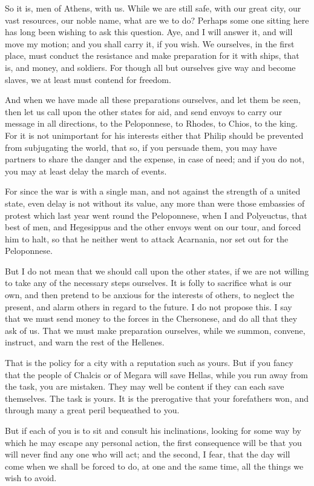 \documentclass[a4paper]{amsbook}
\begin{document}
So it is, men of Athens, with us. While we are still safe, with our great city, our vast resources, our noble name, what are we to do? Perhaps some one sitting here has long been wishing to ask this question. Aye, and I will answer it, and will move my motion; and you shall carry it, if you wish. We ourselves, in the first place, must conduct the resistance and make preparation for it with ships, that is, and money, and soldiers. For though all but ourselves give way and become slaves, we at least must contend for freedom.

And when we have made all these preparations ourselves, and let them be seen, then let us call upon the other states for aid, and send envoys to carry our message in all directions, to the Peloponnese, to Rhodes, to Chios, to the king. For it is not unimportant for his interests either that Philip should be prevented from subjugating the world, that so, if you persuade them, you may have partners to share the danger and the expense, in case of need; and if you do not, you may at least delay the march of events.

For since the war is with a single man, and not against the strength of a united state, even delay is not without its value, any more than were those embassies of protest which last year went round the Peloponnese, when I and Polyeuctus, that best of men, and Hegesippus and the other envoys went on our tour, and forced him to halt, so that he neither went to attack Acarnania, nor set out for the Peloponnese.

But I do not mean that we should call upon the other states, if we are not willing to take any of the necessary steps ourselves. It is folly to sacrifice what is our own, and then pretend to be anxious for the interests of others, to neglect the present, and alarm others in regard to the future. I do not propose this. I say that we must send money to the forces in the Chersonese, and do all that they ask of us. That we must make preparation ourselves, while we summon, convene, instruct, and warn the rest of the Hellenes.

That is the policy for a city with a reputation such as yours. But if you fancy that the people of Chalcis or of Megara will save Hellas, while you run away from the task, you are mistaken. They may well be content if they can each save themselves. The task is yours. It is the prerogative that your forefathers won, and through many a great peril bequeathed to you.

But if each of you is to sit and consult his inclinations, looking for some way by which he may escape any personal action, the first consequence will be that you will never find any one who will act; and the second, I fear, that the day will come when we shall be forced to do, at one and the same time, all the things we wish to avoid.
\end{document}
